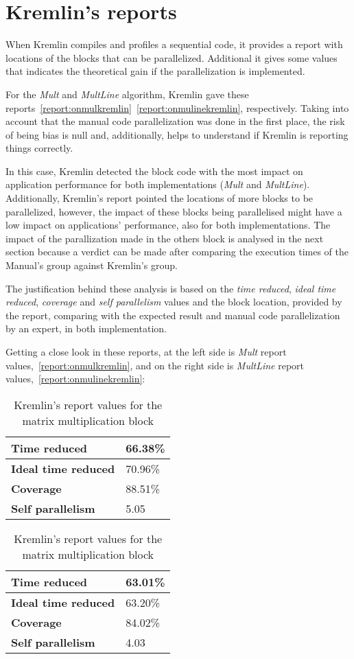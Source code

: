 \section{Kremlin's reports}

When Kremlin compiles and profiles a sequential code, it provides a report with locations of the blocks that can be parallelized. Additional it gives some values that indicates the theoretical gain if the parallelization is implemented.

For the \textit{Mult} and \textit{MultLine} algorithm, Kremlin gave these reports~\ref{report:onmulkremlin}~\ref{report:onmulinekremlin}, respectively. Taking into account that the manual code parallelization was done in the first place, the risk of being bias is null and, additionally, helps to understand if Kremlin is reporting things correctly.

In this case, Kremlin detected the block code with the most impact on application performance for both implementations (\textit{Mult} and \textit{MultLine}). Additionally, Kremlin's report pointed the locations of more blocks to be parallelized, however, the impact of these blocks being parallelised might have a low impact on applications' performance, also for both implementations. The impact of the parallization made in the others block is analysed in the next section because a verdict can be made after comparing the execution times of the Manual's group against Kremlin's group. 

The justification behind these analysis is based on the \textit{ time reduced}, \textit{ideal time reduced}, \textit{coverage} and \textit{self parallelism} values and the block location, provided by the report, comparing with the expected result and manual code parallelization by an expert, in both implementation.

Getting a close look in these reports, at the left side is \textit{Mult} report values,~\ref{report:onmulkremlin}, and on the right side is \textit{MultLine} report values,~\ref{report:onmulinekremlin}:

\begin{table}[htb]
\centering
\caption{Kremlin's report values for the matrix multiplication block}
\begin{tabular}{ |l|l| }
	\hline
	\textbf{Time reduced} & 66.38\% \\ \hline
	\textbf{Ideal time reduced} & 70.96\% \\ \hline
	\textbf{Coverage} & 88.51\% \\ \hline
	\textbf{Self parallelism} & 5.05 \\
	\hline
\end{tabular}
\quad
\begin{tabular}{ |l|l| }
	\hline
	\textbf{Time reduced} & 63.01\% \\ \hline
	\textbf{Ideal time reduced} & 63.20\% \\ \hline
	\textbf{Coverage} & 84.02\% \\ \hline
	\textbf{Self parallelism} & 4.03 \\
	\hline
\end{tabular}
\end{table}

